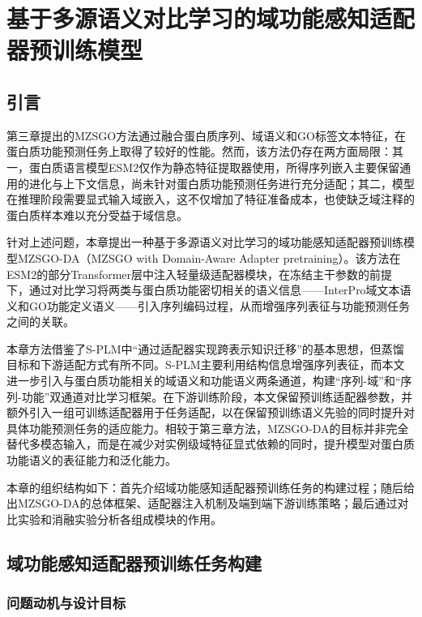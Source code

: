 
\chapter{基于多源语义对比学习的域功能感知适配器预训练模型}

\section{引言}

第三章提出的MZSGO方法通过融合蛋白质序列、域语义和GO标签文本特征，在蛋白质功能预测任务上取得了较好的性能。然而，该方法仍存在两方面局限：其一，蛋白质语言模型ESM2仅作为静态特征提取器使用，所得序列嵌入主要保留通用的进化与上下文信息，尚未针对蛋白质功能预测任务进行充分适配；其二，模型在推理阶段需要显式输入域嵌入，这不仅增加了特征准备成本，也使缺乏域注释的蛋白质样本难以充分受益于域信息。

针对上述问题，本章提出一种基于多源语义对比学习的域功能感知适配器预训练模型MZSGO-DA（MZSGO with Domain-Aware Adapter pretraining）。该方法在ESM2的部分Transformer层中注入轻量级适配器模块，在冻结主干参数的前提下，通过对比学习将两类与蛋白质功能密切相关的语义信息——InterPro域文本语义和GO功能定义语义——引入序列编码过程，从而增强序列表征与功能预测任务之间的关联。

本章方法借鉴了S-PLM\cite{wang2025splm}中“通过适配器实现跨表示知识迁移”的基本思想，但蒸馏目标和下游适配方式有所不同。S-PLM主要利用结构信息增强序列表征，而本文进一步引入与蛋白质功能相关的域语义和功能语义两条通道，构建“序列-域”和“序列-功能”双通道对比学习框架。在下游训练阶段，本文保留预训练适配器参数，并额外引入一组可训练适配器用于任务适配，以在保留预训练语义先验的同时提升对具体功能预测任务的适应能力。相较于第三章方法，MZSGO-DA的目标并非完全替代多模态输入，而是在减少对实例级域特征显式依赖的同时，提升模型对蛋白质功能语义的表征能力和泛化能力。

本章的组织结构如下：首先介绍域功能感知适配器预训练任务的构建过程；随后给出MZSGO-DA的总体框架、适配器注入机制及端到端下游训练策略；最后通过对比实验和消融实验分析各组成模块的作用。

\section{域功能感知适配器预训练任务构建}

\subsection{问题动机与设计目标}

